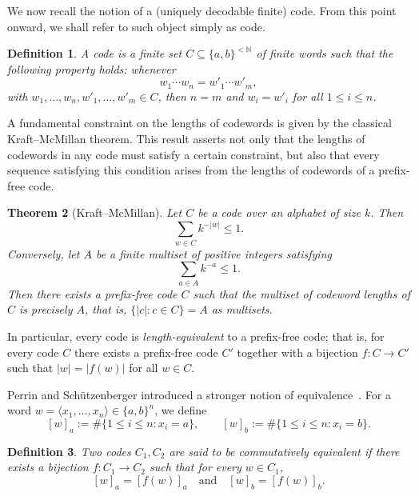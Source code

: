 \documentclass[a4,12pt]{article}%
\newtheorem{theorem}{Theorem}[section]
\newtheorem{definition}[theorem]{Definition}
\begin{document}
\medskip

We now recall the notion of a (uniquely decodable finite) code. From this point onward, we shall refer to such object simply as code.

\begin{definition}
A \emph{code} is a finite set $C \subseteq \{a,b\}^{<\mathbb{N}}$ of finite words such that the following property holds: whenever
\[
w_1 \cdots w_n = w'_1 \cdots w'_m,
\]
with $w_1,\dots,w_n, w'_1,\dots,w'_m \in C$, then $n = m$ and $w_i = w'_i$ for all $1 \le i \le n$.
\end{definition}

\medskip

A fundamental constraint on the lengths of codewords is given by the classical Kraft–McMillan theorem. This result asserts not only that the lengths of codewords in any code must satisfy a certain constraint, but also that every sequence satisfying this condition arises from the lengths of codewords of a prefix-free code.
\begin{theorem}[Kraft--McMillan]
Let $C$ be a code over an alphabet of size $k$. Then
\[
\sum_{w \in C} k^{-\lvert w \rvert} \leq 1.
\]
Conversely, let $A$ be a finite multiset of positive integers satisfying
\[
\sum_{a \in A} k^{-a} \leq 1.
\]
Then there exists a prefix-free code $C$ such that the multiset of codeword lengths of $C$ is precisely $A$, that is, $\{ \lvert c \rvert : c \in C \} = A$ as multisets.
\end{theorem}

\medskip

In particular, every code is \emph{length-equivalent} to a prefix-free code; that is, for every code $C$ there exists a prefix-free code $C'$ together with a bijection $f \colon C \to C'$ such that $\lvert w \rvert = \lvert f(w) \rvert$ for all $w \in C$.

\medskip

Perrin and Sch\"{u}tzenberger introduced a stronger notion of equivalence~\cite{CECoriginalConjecture}. For a word $w = \langle x_1 ,\dots, x_n \rangle \in \{a,b\}^{n}$, we define
\[
[w]_a := \#\{1 \le i \le n : x_i = a\}, \qquad [w]_b := \#\{1 \le i \le n : x_i = b\}.
\]

\begin{definition}
Two codes $C_1, C_2$ are said to be \emph{commutatively equivalent} if there exists a bijection $f \colon C_1 \to C_2$ such that for every $w \in C_1$,
\[
[w]_a = [f(w)]_a \quad \text{and} \quad [w]_b = [f(w)]_b.
\]
\end{definition}
\end{document}
